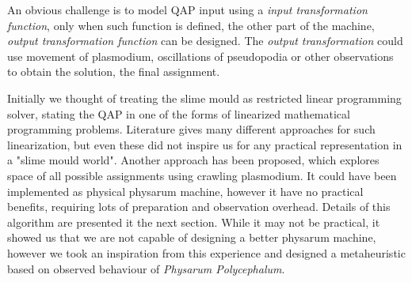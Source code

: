 An obvious challenge is to model QAP input using a \textit{input transformation function}, only when such function is defined, the other part of the machine, \textit{output transformation function} can be designed. The \textit{output transformation} could use movement of plasmodium, oscillations of pseudopodia or other observations to obtain the solution, the final assignment.

Initially we thought of treating the slime mould as restricted linear programming solver, stating the QAP in one of the forms of linearized mathematical programming problems. Literature gives many different approaches for such linearization, but even these did not inspire us for any practical representation in a "slime mould world". Another approach has been proposed, which explores space of all possible assignments using crawling plasmodium. It could have been implemented as physical physarum machine, however it have no practical benefits, requiring lots of preparation and observation overhead. Details of this algorithm are presented it the next section. While it may not be practical, it showed us that we are not capable of designing a better physarum machine, however we took an inspiration from this experience and designed a metaheuristic based on observed behaviour of \textit{Physarum Polycephalum}.




